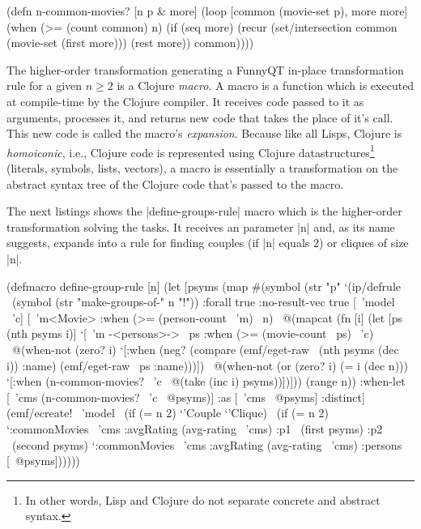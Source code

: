 \documentclass[submission]{eptcs}
\newcommand{\code}{\clojureinline}
\begin{document}
\begin{clojurecode}
(defn n-common-movies? [n p & more]
  (loop [common (movie-set p), more more]
    (when (>= (count common) n)
      (if (seq more)
        (recur (set/intersection common (movie-set (first more))) (rest more))
        common))))
\end{clojurecode}

The higher-order transformation generating a FunnyQT in-place transformation
rule for a given \(n \geq 2\)
is a Clojure \emph{macro}.  A macro is a function which is executed at
compile-time by the Clojure compiler.  It receives code passed to it as
arguments, processes it, and returns new code that takes the place of it's
call.  This new code is called the macro's \emph{expansion}.  Because like all
Lisps, Clojure is \emph{homoiconic}, i.e., Clojure code is represented using
Clojure datastructures\footnote{In other words, Lisp and Clojure do not
  separate concrete and abstract syntax.} (literals, symbols, lists, vectors),
a macro is essentially a transformation on the abstract syntax tree of the
Clojure code that's passed to the macro.

The next listings shows the \code|define-groups-rule| macro which is the
higher-order transformation solving the tasks.  It receives an parameter
\code|n| and, as its name suggests, expands into a rule for finding couples (if
\code|n| equals 2) or cliques of size \code|n|.

\begin{clojurecode}
(defmacro define-group-rule [n]
  (let [psyms (map #(symbol (str "p" %
    `(ip/defrule ~(symbol (str "make-groups-of-" n "!"))
       {:forall true :no-result-vec true}
       [~'model ~'c]
       [~'m<Movie> :when (>= (person-count ~'m) ~n)
        ~@(mapcat (fn [i]
                    (let [ps (nth psyms i)]
                      `[~'m -<persons>-> ~ps
                        :when (>= (movie-count ~ps) ~'c)
                        ~@(when-not (zero? i)
                            `[:when (neg? (compare (emf/eget-raw ~(nth psyms (dec i)) :name)
                                                   (emf/eget-raw ~ps :name)))])
                        ~@(when-not (or (zero? i) (= i (dec n)))
                            `[:when (n-common-movies? ~'c ~@(take (inc i) psyms))])]))
                  (range n))
        :when-let [~'cms (n-common-movies? ~'c ~@psyms)]
        :as [~'cms ~@psyms]
        :distinct]
       (emf/ecreate! ~'model ~(if (= n 2) `'Couple `'Clique)
                     ~(if (= n 2)
                        `{:commonMovies ~'cms :avgRating (avg-rating ~'cms)
                          :p1 ~(first psyms) :p2 ~(second psyms)}
                        `{:commonMovies ~'cms :avgRating (avg-rating ~'cms)
                          :persons [~@psyms]})))))
\end{clojurecode}
\end{document}
